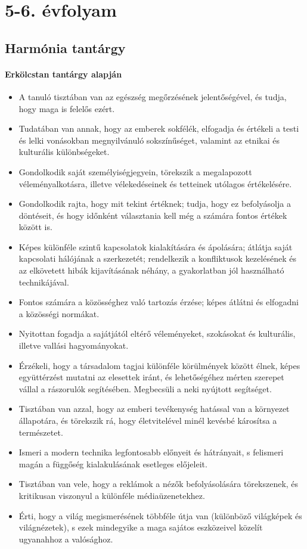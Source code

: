 \section{5-6. évfolyam}
\subsection{Harmónia tantárgy}
\paragraph{Erkölcstan tantárgy alapján}
\begin{itemize}
\item A tanuló tisztában van az egészség megőrzésének jelentőségével, és tudja, hogy maga is felelős ezért.
\item Tudatában van annak, hogy az emberek sokfélék,  elfogadja és értékeli a testi és lelki vonásokban megnyilvánuló sokszínűséget, valamint az etnikai és kulturális különbségeket.
\item Gondolkodik saját személyiségjegyein, törekszik a megalapozott véleményalkotásra, illetve vélekedéseinek és tetteinek utólagos értékelésére.
\item Gondolkodik rajta, hogy mit tekint értéknek; tudja, hogy ez befolyásolja a döntéseit, és hogy időnként választania kell még a számára fontos értékek között is.
\item Képes különféle szintű kapcsolatok kialakítására és ápolására; átlátja saját kapcsolati hálójának a szerkezetét; rendelkezik a konfliktusok kezelésének és az elkövetett hibák kijavításának néhány, a gyakorlatban jól használható technikájával.
\item Fontos számára a közösséghez való tartozás érzése; képes átlátni és elfogadni a közösségi normákat.
\item Nyitottan fogadja a sajátjától eltérő véleményeket, szokásokat és kulturális, illetve vallási hagyományokat.
\item Érzékeli, hogy a társadalom tagjai különféle körülmények között élnek, képes együttérzést mutatni az elesettek iránt, és lehetőségéhez mérten szerepet vállal a rászorulók segítésében. Megbecsüli a neki nyújtott segítséget.
\item Tisztában van azzal, hogy az emberi tevékenység hatással van a környezet állapotára, és törekszik rá, hogy életvitelével minél kevésbé károsítsa a természetet.
\item Ismeri a modern technika legfontosabb előnyeit és hátrányait, s felismeri magán a függőség kialakulásának esetleges előjeleit.
\item Tisztában van vele, hogy a reklámok a nézők befolyásolására törekszenek, és kritikusan viszonyul a különféle médiaüzenetekhez.
\item Érti, hogy a világ megismerésének többféle útja van (különböző világképek és világnézetek), s ezek mindegyike a maga sajátos eszközeivel közelít ugyanahhoz a valósághoz.
\end{itemize}
